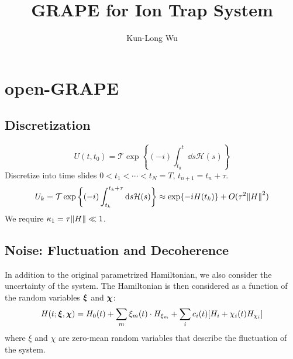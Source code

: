 \documentclass{simple-notes}
\title{GRAPE for Ion Trap System}
\author{Kun-Long Wu}
\begin{document}
\maketitle
\tableofcontents

\newpage
\section{open-GRAPE}
\subsection{Discretization}
\begin{equation}
    U(t, t_0) = \mathcal{T}\exp\left\{(-i)\int_{t_0}^{t}\dd s\mathcal{H}(s)\right\}
\end{equation}
Discretize into time slides $0 < t_1 < \cdots < t_N = T$, $t_{n+1} = t_n + \tau$.
\begin{align*}
    U_k = \mathcal{T}\exp\left\{(-i)\int_{t_k}^{t_k+\tau}\dd s\mathcal{H}(s)\right\} \approx \exp\{-i H(t_k)\} + O(\tau^2 \norm{H}^2) \\
\end{align*}
We require $\kappa_1 = \tau \norm{H}\ll 1$.

\subsection{Noise: Fluctuation and Decoherence}
In addition to the original parametrized Hamiltonian, we also consider the uncertainty of the system. The Hamiltonian is then considered as a function of the random variables $\vb*\xi$ and $\vb*\chi$:
\begin{equation}
    H(t; \vb* \xi, \vb* \chi) = H_0(t) + \sum_m \xi_m(t) \cdot H_{\xi_m}+ \sum_{i} c_i(t) [H_i + \chi_i(t) H_{\chi_i}]
    \label{eq:total_hamiltonian}
\end{equation}
where $\xi$ and $\chi$ are zero-mean random variables that describe the fluctuation of the system.
\end{document}
